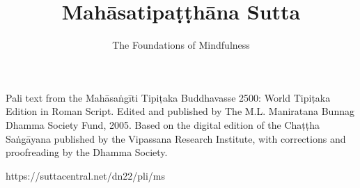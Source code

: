 \documentclass[
  babelLanguage=british,
  final,
  toneMarksAbove,
  webversion,
]{chantingbook}
\title{Mahāsatipaṭṭhāna Sutta}
\subtitle{The Foundations of Mindfulness}
\begin{document}
\frontmatter


\cleartoverso
\thispagestyle{empty}\mbox{}


\cleartorecto
\tableofcontents*

\clearpage
\thispagestyle{empty}

{\fontsize{9}{12}\selectfont
\mbox{}

\vfill

Pali text from the Mahāsaṅgīti Tipiṭaka Buddhavasse 2500: World Tipiṭaka Edition
in Roman Script. Edited and published by The M.L. Maniratana Bunnag Dhamma
Society Fund, 2005. Based on the digital edition of the Chaṭṭha Saṅgāyana
published by the Vipassana Research Institute, with corrections and proofreading
by the Dhamma Society.

https://suttacentral.net/dn22/pli/ms

}

\mainmatter

\showpartnumberfalse
\cleartorecto
\thispagestyle{empty}


\artopttrue




\end{document}
